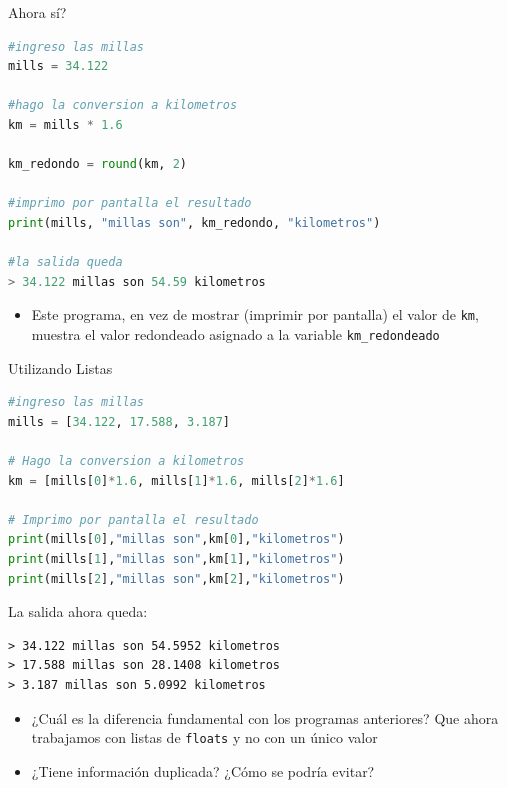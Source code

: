 \documentclass{beamer}
\begin{document}
\begin{frame}[fragile]{Ahora sí?}

\begin{lstlisting}[language=Python]
#ingreso las millas 
mills = 34.122

#hago la conversion a kilometros
km = mills * 1.6

km_redondo = round(km, 2)

#imprimo por pantalla el resultado
print(mills, "millas son", km_redondo, "kilometros")

#la salida queda 
> 34.122 millas son 54.59 kilometros
\end{lstlisting} \pause

\begin{itemize}
    \item Este programa, en vez de mostrar (imprimir por pantalla) el valor de \texttt{km}, muestra el valor redondeado asignado a la variable \texttt{km\_redondeado}
\end{itemize}
\end{frame}


\begin{frame}[fragile]{Utilizando Listas}
\begin{lstlisting}[language=Python]
#ingreso las millas 
mills = [34.122, 17.588, 3.187] 

# Hago la conversion a kilometros
km = [mills[0]*1.6, mills[1]*1.6, mills[2]*1.6]

# Imprimo por pantalla el resultado
print(mills[0],"millas son",km[0],"kilometros")  
print(mills[1],"millas son",km[1],"kilometros")  
print(mills[2],"millas son",km[2],"kilometros")
\end{lstlisting} \pause

La salida ahora queda:
\begin{lstlisting}
> 34.122 millas son 54.5952 kilometros
> 17.588 millas son 28.1408 kilometros
> 3.187 millas son 5.0992 kilometros
\end{lstlisting} \pause

\begin{itemize}
    \item ¿Cuál es la diferencia fundamental con los programas anteriores? \pause Que ahora trabajamos con listas de \texttt{floats} y no con un único valor \pause
    \item ¿Tiene información duplicada? \pause ¿Cómo se podría evitar?
\end{itemize}
\end{frame}
\end{document}
